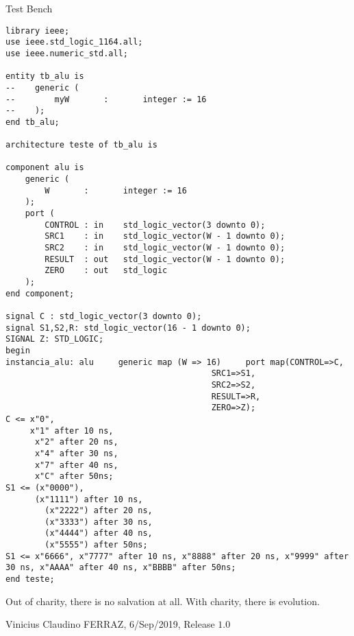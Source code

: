 \documentclass[12pt]{article}
\begin{document}
\vspace{10mm}

\Large

\begin{center}
Test Bench
\end{center}

\normalsize

\begin{verbatim}
library ieee;
use ieee.std_logic_1164.all;
use ieee.numeric_std.all;

entity tb_alu is
--    generic (
--        myW       :       integer := 16
--    );
end tb_alu;

architecture teste of tb_alu is

component alu is
    generic (
        W       :       integer := 16
    );
    port (
        CONTROL : in    std_logic_vector(3 downto 0);
        SRC1    : in    std_logic_vector(W - 1 downto 0);
        SRC2    : in    std_logic_vector(W - 1 downto 0);
        RESULT  : out   std_logic_vector(W - 1 downto 0);
        ZERO    : out   std_logic
    );
end component;

signal C : std_logic_vector(3 downto 0);
signal S1,S2,R: std_logic_vector(16 - 1 downto 0);
SIGNAL Z: STD_LOGIC;
begin
instancia_alu: alu     generic map (W => 16)	 port map(CONTROL=>C,
                                          SRC1=>S1,
                                          SRC2=>S2,
                                          RESULT=>R,
                                          ZERO=>Z);
C <= x"0",
     x"1" after 10 ns,
	  x"2" after 20 ns,
	  x"4" after 30 ns,
	  x"7" after 40 ns,
	  x"C" after 50ns;
S1 <= (x"0000"),
      (x"1111") after 10 ns,
		(x"2222") after 20 ns,
		(x"3333") after 30 ns,
		(x"4444") after 40 ns,
		(x"5555") after 50ns;
S1 <= x"6666", x"7777" after 10 ns, x"8888" after 20 ns, x"9999" after 30 ns, x"AAAA" after 40 ns, x"BBBB" after 50ns;
end teste;
\end{verbatim}


\vspace{3mm}

Out of charity, there is no salvation at all. With charity, there is evolution.

\vspace{3mm}

Vinicius Claudino FERRAZ, 6/Sep/2019, Release $1.0$
\end{document}
